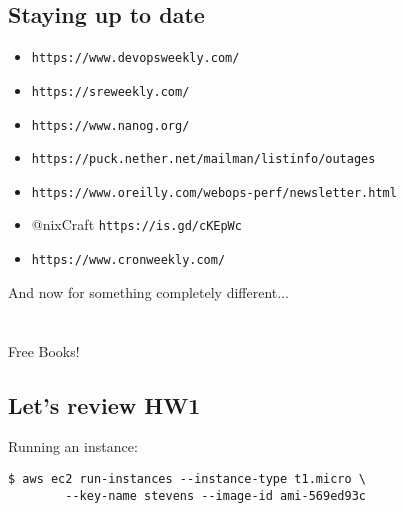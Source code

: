 \documentclass[xga]{xdvislides}
\begin{document}
\subsection{Staying up to date}

\begin{itemize}
        \item {\tt https://www.devopsweekly.com/}
        \item {\tt https://sreweekly.com/}
        \item {\tt https://www.nanog.org/}
        \item {\tt https://puck.nether.net/mailman/listinfo/outages}
	\item {\tt https://www.oreilly.com/webops-perf/newsletter.html}
	\item @nixCraft {\tt https://is.gd/cKEpWc} 
	\item {\tt https://www.cronweekly.com/}
\end{itemize}

\newpage
\vspace*{\fill}
\begin{center}
	\Hugesize
		And now for something completely different... \\ [1em]
	\hspace*{5mm}
	\blueline\\
	\hspace*{5mm}\\
		Free Books!
\end{center}
\vspace*{\fill}

\newpage
%

\subsection{Let's review HW1}
\vspace{.5in}
Running an instance:
\begin{verbatim}
$ aws ec2 run-instances --instance-type t1.micro \
        --key-name stevens --image-id ami-569ed93c
\end{verbatim}
\end{document}
